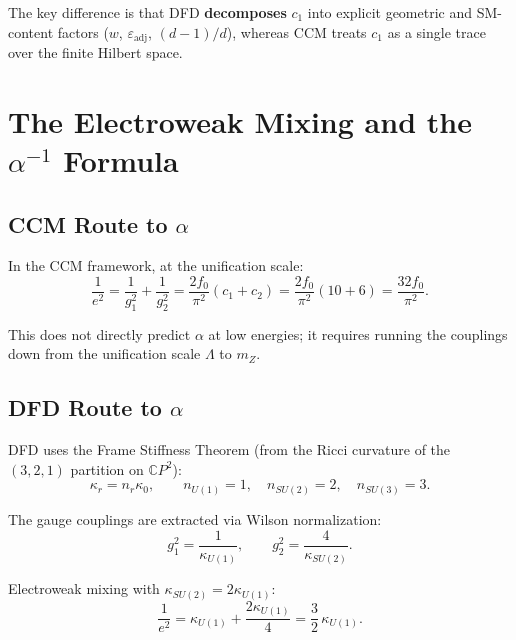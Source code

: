 \documentclass[12pt,a4paper]{article}
\begin{document}
The key difference is that DFD \textbf{decomposes} $c_1$ into explicit
geometric and SM-content factors ($w$, $\varepsilon_{\mathrm{adj}}$,
$(d-1)/d$), whereas CCM treats $c_1$ as a single trace over the finite
Hilbert space.

\section{The Electroweak Mixing and the $\alpha^{-1}$ Formula}
\label{sec:alpha}

\subsection{CCM Route to $\alpha$}

In the CCM framework, at the unification scale:
\begin{equation}
\frac{1}{e^2} = \frac{1}{g_1^2} + \frac{1}{g_2^2}
= \frac{2f_0}{\pi^2}(c_1 + c_2)
= \frac{2f_0}{\pi^2}(10 + 6) = \frac{32 f_0}{\pi^2}.
\end{equation}

This does not directly predict $\alpha$ at low energies; it requires running
the couplings down from the unification scale $\Lambda$ to $m_Z$.

\subsection{DFD Route to $\alpha$}

DFD uses the Frame Stiffness Theorem (from the Ricci curvature of the
$(3,2,1)$ partition on $\mathbb{C}P^2$):
\begin{equation}
\kappa_r = n_r \kappa_0, \qquad n_{U(1)} = 1, \quad n_{SU(2)} = 2,
\quad n_{SU(3)} = 3.
\end{equation}

The gauge couplings are extracted via Wilson normalization:
\begin{equation}
g_1^2 = \frac{1}{\kappa_{U(1)}}, \qquad
g_2^2 = \frac{4}{\kappa_{SU(2)}}.
\end{equation}

Electroweak mixing with $\kappa_{SU(2)} = 2\kappa_{U(1)}$:
\begin{equation}
\frac{1}{e^2} = \kappa_{U(1)} + \frac{2\kappa_{U(1)}}{4}
= \frac{3}{2}\,\kappa_{U(1)}.
\end{equation}
\end{document}
